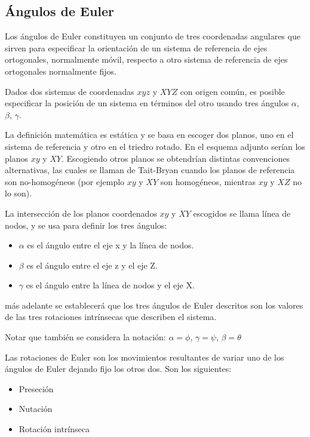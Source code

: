 \subsection{Ángulos de Euler}
%

Los ángulos de Euler constituyen un conjunto de tres coordenadas angulares que
sirven para especificar la orientación de un sistema de referencia de ejes
ortogonales, normalmente móvil, respecto a otro sistema de referencia de ejes
ortogonales normalmente fijos.

Dados dos sistemas de coordenadas $xyz$ y $XYZ$ con origen común, es posible
especificar la posición de un sistema en términos del otro usando tres ángulos
$\alpha$, $\beta$, $\gamma$.

La definición matemática es estática y se basa en escoger dos planos, uno en el
sistema de referencia y otro en el triedro rotado. En el esquema adjunto serían
los planos $xy$ y $XY$. Escogiendo otros planos se obtendrían distintas convenciones
alternativas, las cuales se llaman de Tait-Bryan cuando los planos de referencia
son no-homogéneos (por ejemplo $xy$ y $XY$ son homogéneos, mientras $xy$ y $XZ$ no lo
son).

La intersección de los planos coordenados $xy$ y $XY$ escogidos se llama línea de
nodos, y se usa para definir los tres ángulos:

\begin{itemize}
    \item $\alpha$ es el ángulo entre el eje x y la línea de nodos.
    \item $\beta$  es el ángulo entre el eje z y el eje Z.
    \item $\gamma$  es el ángulo entre la línea de nodos y el eje X.
\end{itemize}

más adelante se establecerá que los tres ángulos de Euler descritos son los
valores de las tres rotaciones intrínsecas que describen el sistema.

Notar que también se considera la notación: $\alpha =\phi$, $\gamma =\psi$,
$\beta =\theta$

Las rotaciones de Euler son los movimientos resultantes de variar uno de los
ángulos de Euler dejando fijo los otros dos. Son los siguientes:

\begin{itemize}
    \item Preseción
    \item Nutación
    \item Rotación intrínseca
\end{itemize}

